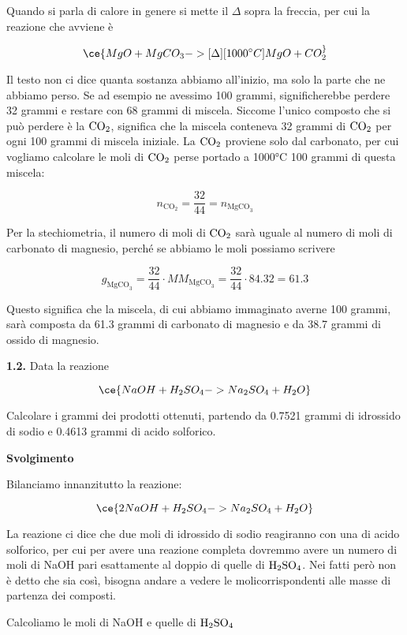 Quando si parla di calore in genere si mette il $\Delta$ sopra la freccia, per cui la reazione che avviene è

$$\ce{MgO + MgCO_3 ->[{\Delta}][{1000^{\circ}C}] MgO + CO_2 ^}$$

Il testo non ci dice quanta sostanza abbiamo all'inizio, ma solo la parte che ne abbiamo perso. Se ad esempio ne avessimo 100 grammi, significherebbe perdere 32 grammi e restare con 68 grammi di miscela. Siccome l'unico composto che si può perdere è la $\rm CO_2$, significa che la miscela conteneva 32 grammi di $\rm CO_2$ per ogni 100 grammi di miscela iniziale. La $\rm CO_2$ proviene solo dal carbonato, per cui vogliamo calcolare le moli di $\rm CO_2$ perse portado a 1000°C 100 grammi di questa miscela:

$$n_{\text{CO}_2}=\frac{32}{44}=n_{\text{MgCO}_3}$$

Per la stechiometria, il numero di moli di $\rm CO_2$ sarà uguale al numero di moli di carbonato di magnesio, perché se abbiamo le moli possiamo scrivere

$$g_{\text{MgCO}_3}=\frac{32}{44} \cdot MM_{\text{MgCO}_3}
=\frac{32}{44} \cdot 84.32=61.3$$

Questo significa che la miscela, di cui abbiamo immaginato averne 100 grammi, sarà composta da 61.3 grammi di carbonato di magnesio e da 38.7 grammi di ossido di magnesio.

\vspace{0.2cm}\textbf{1.2.} Data la reazione

$$\ce{NaOH + H_2SO_4 -> Na_2SO_4 + H_2O}$$

Calcolare i grammi dei prodotti ottenuti, partendo da 0.7521 grammi di idrossido di sodio e 0.4613 grammi di acido solforico.

\vspace{0.2cm}\large\textbf{Svolgimento}\normalsize

\vspace{0.2cm}Bilanciamo innanzitutto la reazione:

$$\ce{2NaOH + H_2SO_4 -> Na_2SO_4 + H_2O}$$

La reazione ci dice che due moli di idrossido di sodio reagiranno con una di acido solforico, per cui per avere una reazione completa dovremmo avere un numero di moli di NaOH pari esattamente al doppio di quelle di $\rm H_2SO_4$. Nei fatti però non è detto che sia così, bisogna andare a vedere le molicorrispondenti alle masse di partenza dei composti.

Calcoliamo le moli di NaOH e quelle di $\rm H_2SO_4$

